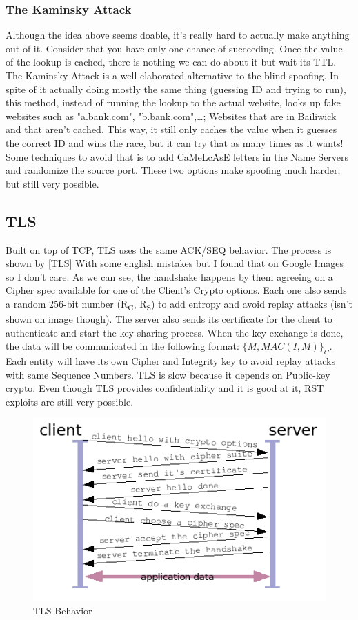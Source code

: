 \documentclass[11pt]{article}
\begin{document}
{\subsubsection{The Kaminsky Attack}
\label{sec:orgac06e7f}
Although the idea above seems doable, it's really hard to actually make anything out of it. Consider that you have only one chance of succeeding. Once the value of the lookup is cached, there is nothing we can do about it but wait its TTL. The Kaminsky Attack is a well elaborated alternative to the blind spoofing. In spite of it actually doing mostly the same thing (guessing ID and trying to run), this method, instead of running the lookup to the actual website, looks up fake websites such as "a.bank.com", "b.bank.com",\ldots{}; Websites that are in Bailiwick and that aren't cached. This way, it still only caches the value when it guesses the correct ID and wins the race, but it can try that as many times as it wants! Some techniques to avoid that is to add CaMeLcAsE letters in the Name Servers and randomize the source port. These two options make spoofing much harder, but still very possible.

\subsection{TLS}
\label{sec:orge89b1fd}
Built on top of TCP, TLS uses the same ACK/SEQ behavior. The process is shown by \ref{TLS} \sout{With some english mistakes but I found that on Google Images so I don't care}. As we can see, the handshake happens by them agreeing on a Cipher spec available for one of the Client's Crypto options. Each one also sends a random 256-bit number (R\textsubscript{C}, R\textsubscript{S}) to add entropy and avoid replay attacks (isn't shown on image though). The server also sends its certificate for the client to authenticate and start the key sharing process. When the key exchange is done, the data will be communicated in the following format: \(\{M,MAC(I, M)\}_C\). Each entity will have its own Cipher and Integrity key to avoid replay attacks with same Sequence Numbers. TLS is slow because it depends on Public-key crypto. Even though TLS provides confidentiality and it is good at it, RST exploits are still very possible.

\begin{figure}[htbp]
\centering
\includegraphics[height=0.5\textwidth]{res/TLS.png}
\caption{\label{fig:org49cee2a}TLS Behavior}
\end{figure}

}
\end{document}
